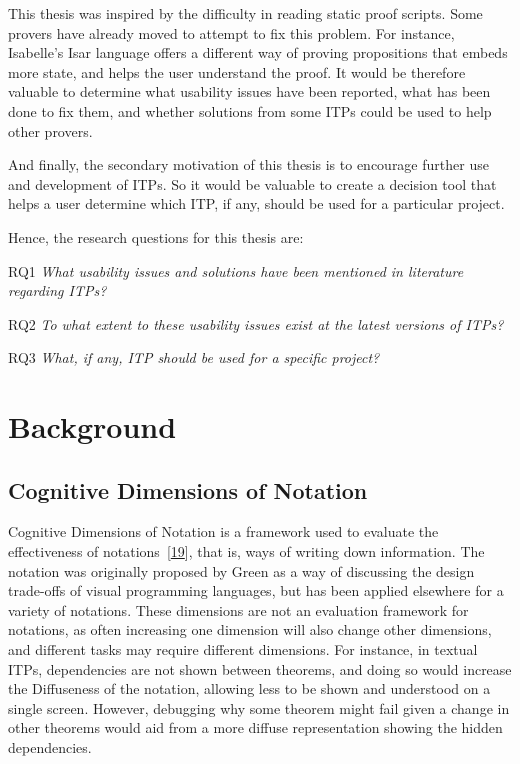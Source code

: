 \documentclass[
]{article}
\begin{document}
This thesis was inspired by the difficulty in reading static proof
scripts. Some provers have already moved to attempt to fix this problem.
For instance, Isabelle's Isar language offers a different way of proving
propositions that embeds more state, and helps the user understand the
proof. It would be therefore valuable to determine what usability issues
have been reported, what has been done to fix them, and whether
solutions from some ITPs could be used to help other provers.

And finally, the secondary motivation of this thesis is to encourage
further use and development of ITPs. So it would be valuable to create a
decision tool that helps a user determine which ITP, if any, should be
used for a particular project.

Hence, the research questions for this thesis are:

RQ1 \emph{What usability issues and solutions have been mentioned in
literature regarding ITPs?}

RQ2 \emph{To what extent to these usability issues exist at the latest
versions of ITPs?}

RQ3 \emph{What, if any, ITP should be used for a specific project?}

\hypertarget{background}{%
\section{Background}\label{background}}

\hypertarget{cognitive-dimensions-of-notation}{%
\subsection{Cognitive Dimensions of
Notation}\label{cognitive-dimensions-of-notation}}

Cognitive Dimensions of Notation is a framework used to evaluate the
effectiveness of
notations~{[}\protect\hyperlink{ref-green_usability_1996}{19}{]}, that
is, ways of writing down information. The notation was originally
proposed by Green as a way of discussing the design trade-offs of visual
programming languages, but has been applied elsewhere for a variety of
notations. These dimensions are not an evaluation framework for
notations, as often increasing one dimension will also change other
dimensions, and different tasks may require different dimensions. For
instance, in textual ITPs, dependencies are not shown between theorems,
and doing so would increase the Diffuseness of the notation, allowing
less to be shown and understood on a single screen. However, debugging
why some theorem might fail given a change in other theorems would aid
from a more diffuse representation showing the hidden dependencies.
\end{document}
